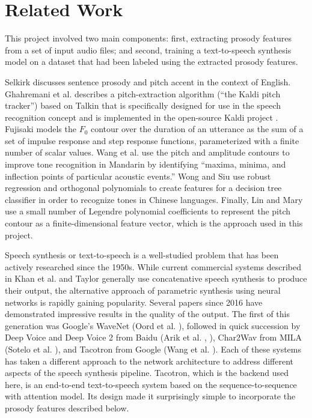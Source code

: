 \documentclass{article}
\begin{document}
\section{Related Work}
\label{sec:sota}

This project involved two main components: first, extracting prosody features from a set of input audio files; and second, training a text-to-speech synthesis model on a dataset that had been labeled using the extracted prosody features.

Selkirk \cite{selkirk1995sentence} discusses sentence prosody and pitch accent in the context of English. Ghahremani et al. \cite{ghahremani2014pitch} describes a pitch-extraction algorithm (``the Kaldi pitch tracker'') based on Talkin \cite{talkin1995robust} that is specifically designed for use in the speech recognition concept and is implemented in the open-source Kaldi project \cite{Povey_ASRU2011}. Fujisaki \cite{fujisaki2004information} models the $F_0$ contour over the duration of an utterance as the sum of a set of impulse response and step response functions, parameterized with a finite number of scalar values.
Wang et al. \cite{wang2008mandarin} use the pitch and amplitude contours to improve tone recognition in Mandarin by identifying ``maxima, minima, and inflection points of particular acoustic events.''
Wong and Siu \cite{pui2004decision} use robust regression and orthogonal polynomials to create features for a decision tree classifier in order to recognize tones in Chinese languages. Finally, Lin \cite{lin2005language} and Mary \cite{mary2011extraction} use a small number of Legendre polynomial coefficients to represent the pitch contour as a finite-dimensional feature vector, which is the approach used in this project.

Speech synthesis or text-to-speech is a well-studied problem that has been actively researched since the 1950s. While current commercial systems described in Khan et al. \cite{khan2016concatenative} and Taylor \cite{taylor2009text} generally use concatenative speech synthesis to produce their output, the alternative approach of parametric synthesis using neural networks is rapidly gaining popularity. Several papers since 2016 have demonstrated impressive results in the quality of the output.
The first of this generation was Google's WaveNet (Oord et al. \cite{oord2016wavenet}), followed in quick succession by Deep Voice and Deep Voice 2 from Baidu (Arik et al. \cite{arik2017deep}, \cite{arik2017deep2}), Char2Wav from MILA (Sotelo et al. \cite{sotelo2017char2wav}), and Tacotron from Google (Wang et al. \cite{wang2017tacotron}).
Each of these systems has taken a different approach to the network architecture to address different aspects of the speech synthesis pipeline. Tacotron, which is the backend used here, is an end-to-end text-to-speech system based on the sequence-to-sequence with attention model. Its design made it surprisingly simple to incorporate the prosody features described below.
\end{document}
